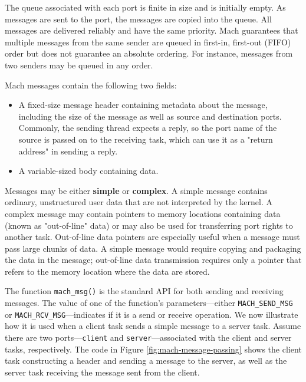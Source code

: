 The queue associated with each port is finite in size and is initially empty. As messages are sent to the port, the messages are copied into the queue. All messages are delivered reliably and have the same priority. Mach guarantees that multiple messages from the same sender are queued in first-in, first-out (FIFO) order but does not guarantee an absolute ordering. For instance, messages from two senders may be queued in any order.

Mach messages contain the following two fields:
\begin{itemize}
\item A fixed-size message header containing metadata about the message, including the size of the message as well as source and destination ports. Commonly, the sending thread expects a reply, so the port name of the source is passed on to the receiving task, which can use it as a "return address" in sending a reply.
\item A variable-sized body containing data.
\end{itemize}
Messages may be either \textbf{simple} or \textbf{complex}. A simple message contains ordinary, unstructured user data that are not interpreted by the kernel. A complex message may contain pointers to memory locations containing data (known as "out-of-line" data) or may also be used for transferring port rights to another task. Out-of-line data pointers are especially useful when a message must pass large chunks of data. A simple message would require copying and packaging the data in the message; out-of-line data transmission requires only a pointer that refers to the memory location where the data are stored.

The function \texttt{mach\_msg()} is the standard API for both sending and receiving messages. The value of one of the function's parameters---either \texttt{MACH\_SEND\_MSG} or \texttt{MACH\_RCV\_MSG}---indicates if it is a send or receive operation. We now illustrate how it is used when a client task sends a simple message to a server task. Assume there are two ports---\texttt{client} and \texttt{server}---associated with the client and server tasks, respectively. The code in Figure \ref{fig:mach-message-passing} shows the client task constructing a header and sending a message to the server, as well as the server task receiving the message sent from the client.

